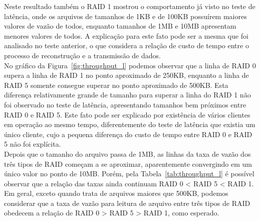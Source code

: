 	Neste resultado também o RAID 1 mostrou o comportamento já visto no teste de latência, onde os arquivos de tamanhos de 1KB e de 100KB possuírem maiores valores de vazão de todos, enquanto tamanhos de 1MB e 10MB apresentam menores valores de todos. A explicação para este fato pode ser a mesma que foi analisado no teste anterior, o que considera a relação de custo de tempo entre o processo de reconstrução e a transmissão de dados.
	\\
	
	No gráfico da Figura~\ref{fig:throughput_l} podemos observar que a linha de RAID 0 supera a linha de RAID 1 no ponto aproximado de 250KB, enquanto a linha de  RAID 5 somente consegue superar no ponto aproximado de 500KB. 
	Esta diferença relativamente grande de tamanho para superar a linha do RAID 1 não foi observado no teste de latência, apresentando tamanhos bem próximos entre RAID 0 e RAID 5. Este fato pode ser explicado por existência de vários clientes em operação ao mesmo tempo, diferentemente do teste de latência que existia um único cliente, cujo a pequena diferença do custo de tempo entre RAID 0 e RAID 5 não foi explícita.
	\\
	
	Depois que o tamanho do arquivo passa de 1MB, as linhas da taxa de vazão dos três tipos de RAID começam a se aproximar, aparentemente convergindo em um único valor no ponto de 10MB. Porém, pela Tabela~\ref{tab:throughput_l} é possível observar que a relação das taxas ainda continuam RAID 0 < RAID 5 < RAID 1.
	\\
	
	Em geral, exceto quando trata de arquivos maiores que 500KB, podemos considerar que a taxa de vazão para leitura de arquivo entre três tipos de RAID obedecem a relação de RAID 0 > RAID 5 > RAID 1, como esperado.
	\\
	
